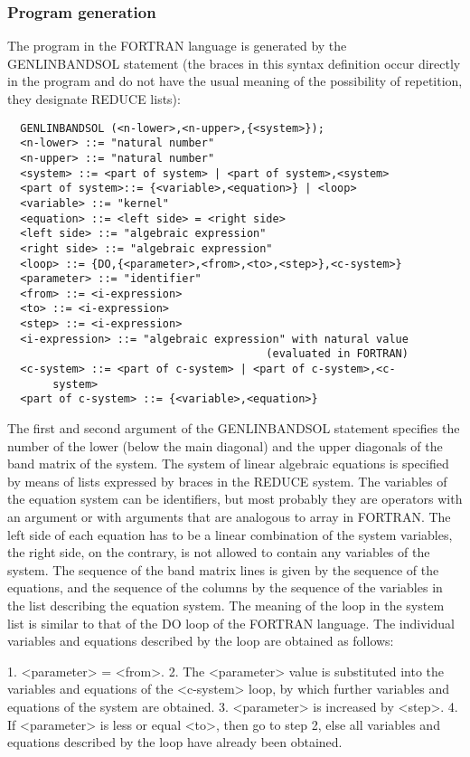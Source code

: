 \subsubsection{Program generation}

     The  program   in  the   FORTRAN  language   is  generated  by  the
GENLINBANDSOL statement (the  braces  in  this  syntax  definition occur
directly  in  the  program  and  do  not  have  the usual meaning of the
possibility of repetition, they designate REDUCE lists):
\begin{verbatim}
  GENLINBANDSOL (<n-lower>,<n-upper>,{<system>});
  <n-lower> ::= "natural number"
  <n-upper> ::= "natural number"
  <system> ::= <part of system> | <part of system>,<system>
  <part of system>::= {<variable>,<equation>} | <loop>
  <variable> ::= "kernel"
  <equation> ::= <left side> = <right side>
  <left side> ::= "algebraic expression"
  <right side> ::= "algebraic expression"
  <loop> ::= {DO,{<parameter>,<from>,<to>,<step>},<c-system>}
  <parameter> ::= "identifier"
  <from> ::= <i-expression>
  <to> ::= <i-expression>
  <step> ::= <i-expression>
  <i-expression> ::= "algebraic expression" with natural value
                                        (evaluated in FORTRAN)
  <c-system> ::= <part of c-system> | <part of c-system>,<c-
       system>
  <part of c-system> ::= {<variable>,<equation>}
\end{verbatim}
The first and second  argument of the GENLINBANDSOL  statement specifies
the  number  of  the  lower  (below  the  main  diagonal)  and the upper
diagonals  of  the  band  matrix  of  the  system.  The system of linear
 algebraic equations is specified by means of lists expressed by  braces
{ } in the  REDUCE system. The variables  of the equation system  can be
identifiers, but most  probably they are  operators with an  argument or
with arguments that are analogous to array in FORTRAN. The left side  of
each equation has  to be a  linear combination of  the system variables,
the right side, on the contrary, is not allowed to contain any variables
of the system.  The sequence of  the band matrix  lines is given  by the
sequence  of  the  equations,  and  the  sequence  of the columns by the
sequence of the variables in the list describing the equation system.
     The meaning  of the  loop in  the system list is similar to that of
the DO loop  of  the  FORTRAN  language.  The  individual  variables and
equations described by the loop are obtained as follows:

  1. <parameter> = <from>.
  2.  The  <parameter>  value  is  substituted  into the variables and
  equations of the <c-system> loop,  by  which  further  variables and
  equations of the system are obtained.
  3. <parameter> is increased by <step>.
  4. If <parameter> is less or equal <to>, then go to step 2, else all
  variables and equations described  by  the  loop  have  already been
  obtained.

